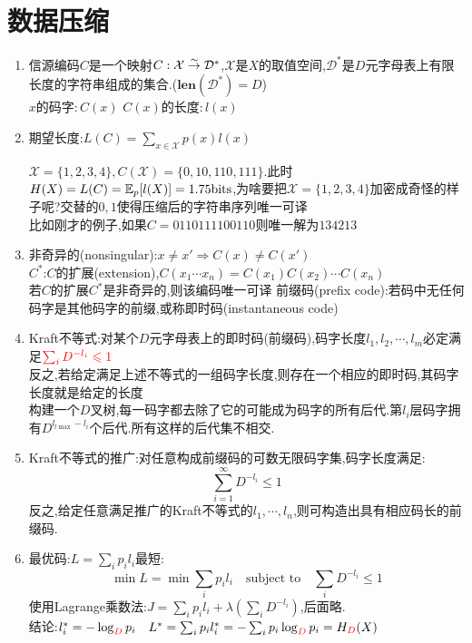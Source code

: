 \documentclass{article}
\begin{document}
\section{数据压缩}
\begin{enumerate}[label=(\arabic*)]
	\item 信源编码$C$是一个映射$C:\mathcal{X}\stackrel{\sim}{\rightarrow} \mathcal{D}^*$,$\mathcal{X}$是$X$的取值空间,$\mathcal{D}^*$是$D$元字母表上有限长度的字符串组成的集合.($\textbf{len}(\mathcal{D}^*)=D$)\\
				$x$的码字:\,$C(x)$ \quad $C(x)$的长度:\,$l(x)$
	\item 期望长度:$L(C) = \sum_{x\in \mathcal{X}}p(x)l(x)$
				\begin{example}
					$\mathcal{X}=\{1,2,3,4\},C(\mathcal{X}) = \{0,10,110,111\}$.此时$H(X) = L(C) = \mathbb{E}_{p}[l(X)] = 1.75\text{bits}$,为啥要把$\mathcal{X} = \{1,2,3,4\}$加密成奇怪的样子呢?交替的$0,1$使得压缩后的字符串序列{\red 唯一可译}\\
					比如刚才的例子,如果$C=0110111100110$则唯一解为$134213$
				\end{example}
	\item 非奇异的(nonsingular):$x\neq x'\Rightarrow C(x)\neq C(x')$\\
				$C^*$:$C$的扩展(extension),$C(x_1\cdots x_n) = C(x_1)C(x_2)\cdots C(x_n)$\\
				若$C$的扩展$C^*$是非奇异的,则该编码唯一可译
				前缀码(prefix code):若码中无任何码字是其他码字的前缀,或称即时码(instantaneous code)
	\item Kraft不等式:对某个$D$元字母表上的即时码(前缀码),码字长度$l_1,l_2,\cdots ,l_m$必定满足$\color{red} \sum_i D^{-l_i} \leqslant 1$\\
				反之,若给定满足上述不等式的一组码字长度,则存在一个相应的即时码,其码字长度就是给定的长度\\
				构建一个$D$叉树,每一码字都去除了它的可能成为码字的所有后代.第$l_i$层码字拥有$D^{l_{l\max}-l_i}$个后代.所有这样的后代集不相交.
	\item Kraft不等式的推广:对任意构成前缀码的可数无限码字集,码字长度满足:
				\[\sum_{i=1}^{\infty}D^{-l_i} \leq 1\]
				反之,给定任意满足推广的Kraft不等式的$l_1,\cdots ,l_n$,则可构造出具有相应码长的前缀码.
	\item 最优码:$L=\sum_i p_i l_i$最短:
				\[\min L = \min\sum_i p_i l_i \quad \text{subject to} \quad \sum_i D^{-l_i} \leq 1\]
				使用Lagrange乘数法:$J = \sum_i p_i l_i+\lambda(\sum_i D^{-l_i})$,后面略.\\
				结论:$l_i^* = -\log_{\color{red} D}p_i \quad L^* = \sum_i p_i l_i^* = -\sum_i p_i \log_{\color{red} D} p_i = H_{\color{red} D}(X)$\\

\end{enumerate}
\end{document}
